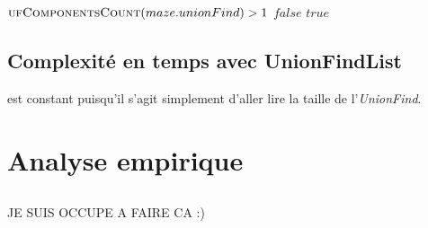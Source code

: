 \begin{codebox}
\li \If $\textnormal{\scshape ufComponentsCount}(maze.unionFind) > 1$
\li \Then \Return $false$
\li \Else
\li \Return $true$
\End
\End
\end{codebox}
	
\subsection{Complexité en temps avec UnionFindList} %

 est constant puisqu'il s'agit simplement d'aller lire la taille de l'\textit{UnionFind}.

\section{Analyse empirique}
\subsection{} %
JE SUIS OCCUPE A FAIRE CA :) 
\subsection{} %
	


